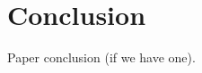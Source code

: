 \documentclass{sigchi}
\begin{document}
\section{Conclusion}
Paper conclusion (if we have one).




%
%
%
%
%
\balance



\end{document}
